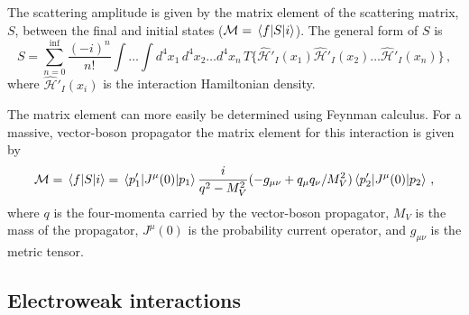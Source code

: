   The scattering amplitude is given by the matrix element of the scattering
  matrix, $S$, between the final and initial states ($\mathcal{M} =
  \mel{f}{S}{i}$).  The general form of $S$ is~\cite{Aitchison:2004cs}
  \begin{equation}
    S = \sum_{n=0}^{\inf} \frac{(-i)^n}{n!}\int\dots\int d^4x_1 \, d^4x_2 \dots d^4x_n\,
      T\{\hat{\mathcal{H}}'_I(x_1)\hat{\mathcal{H}}'_I(x_2)\dots\hat{\mathcal{H}}'_I(x_n)\} \,,
  \end{equation}
  where $\hat{\mathcal{H}}'_I(x_i)$ is the interaction Hamiltonian density.
  
  The matrix element can more easily be determined using Feynman calculus.  For
  a massive, vector-boson propagator the matrix element for this interaction is
  given by~\cite{Aitchison:2004cs}
  \begin{equation}\label{eq:genmatel}
    \mathcal{M} = \mel{f}{S}{i} = \mel{p_1'}{J^{\mu}(0)}{p_1} \frac{i}{q^2 - M_V^2}(-g_{\mu\nu} 
            + q_{\mu}q_{\nu}/M_V^2) \mel{p_2'}{J^{\mu}(0)}{p_2} \,,
  \end{equation}
  where $q$ is the four-momenta carried by the vector-boson propagator, $M_V$
  is the mass of the propagator, $J^{\mu}(0)$ is the probability current
  operator, and $g_{\mu\nu}$ is the metric tensor.


\subsection{Electroweak interactions}

